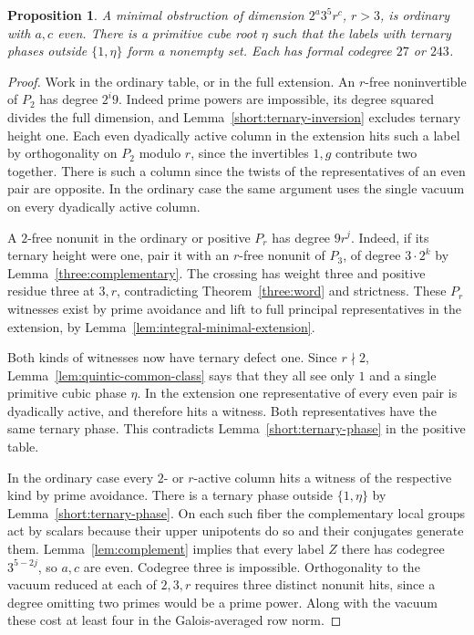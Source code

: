 \documentclass[11pt,a4paper]{article}
\numberwithin{equation}{section}
\newtheorem{proposition}[theorem]{Proposition}
\theoremstyle{remark}
\begin{document}
\begin{proposition}
A minimal obstruction of dimension $2^a3^5r^c$, $r>3$, is ordinary
with $a,c$ even. There is a primitive cube root $\eta$ such that
the labels with ternary phases outside $\{1,\eta\}$ form a nonempty
set. Each has formal codegree $27$ or $243$.
\end{proposition}
\begin{proof}
Work in the ordinary table, or in the full extension.
An $r$-free noninvertible of $P_2$ has degree $2^i9$. Indeed prime powers are impossible, its degree squared divides the full
dimension, and Lemma~\ref{short:ternary-inversion} excludes
ternary height one. Each even dyadically active column in the
extension hits such a label by orthogonality on $P_2$ modulo $r$, since
the invertibles $1,g$ contribute two together. There is such a
column since the twists of the representatives of an even pair
are opposite. In the ordinary case the same argument uses the
single vacuum on every dyadically active column.

A $2$-free nonunit in the ordinary or positive $P_r$ has degree
$9r^j$. Indeed, if its ternary height were one, pair it with an
$r$-free nonunit of $P_3$, of degree $3\cdot2^k$ by
Lemma~\ref{three:complementary}. The crossing has weight three
and positive residue three at $3,r$, contradicting
Theorem~\ref{three:word} and strictness. These $P_r$ witnesses
exist by prime avoidance and lift to full principal representatives
in the extension, by Lemma~\ref{lem:integral-minimal-extension}.

Both kinds of witnesses now have ternary defect one. Since $r\nmid2$,
Lemma~\ref{lem:quintic-common-class} says that they all see only
$1$ and a single primitive cubic phase $\eta$. In the extension
one representative of every even pair is dyadically active, and
therefore hits a witness. Both representatives have the same ternary
phase. This contradicts Lemma~\ref{short:ternary-phase} in the
positive table.

In the ordinary case every $2$- or $r$-active column hits a witness
of the respective kind by prime avoidance. There is a ternary
phase outside $\{1,\eta\}$ by Lemma~\ref{short:ternary-phase}.
On each such fiber the complementary local groups act by scalars because their upper
unipotents do so and their conjugates generate them.
Lemma~\ref{lem:complement} implies that every label $Z$ there has
codegree $3^{5-2j}$, so $a,c$ are even. Codegree three is impossible.
Orthogonality to the vacuum reduced at each of $2,3,r$ requires three
distinct nonunit hits, since a degree omitting two primes would be
a prime power. Along with the vacuum these cost at least four in the
Galois-averaged row norm.
\end{proof}
\end{document}

